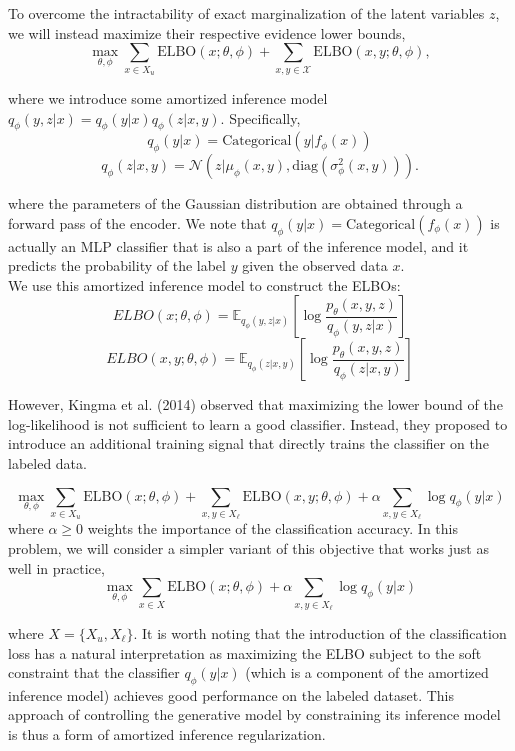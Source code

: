 \documentclass{article}
\theoremstyle{case}
\theoremstyle{definition}
\begin{document}
To overcome the intractability of exact marginalization of the latent variables \( z \), we will instead maximize their respective evidence lower bounds,
\[ \max_{\theta, \phi} \sum_{x \in X_u} \text{ELBO}(x; \theta, \phi) + \sum_{x, y \in \mathcal{X}} \text{ELBO}(x, y; \theta, \phi), \]

where we introduce some amortized inference model \( q_{\phi}(y, z|x) = q_{\phi}(y|x)q_{\phi}(z|x, y) \). Specifically,
\[ q_{\phi}(y|x) = \text{Categorical}(y|f_{\phi}(x)) \]
\[ q_{\phi}(z|x, y) = \mathcal{N}(z|\mu_{\phi}(x, y), \text{diag}(\sigma^2_{\phi}(x, y))). \]

where the parameters of the Gaussian distribution are obtained through a forward pass of the encoder. We note that $q_\phi(y|x) = \text{Categorical}(f_\phi(x))$ 
is actually an MLP classifier that is also a part of the inference model, and it predicts the probability of the label $y$ given the observed data $x$. \\

We use this amortized inference model to construct the ELBOs:
\[ ELBO(x; \theta, \phi) = \mathbb{E}_{q_\phi(y,z|x)} \left[ \log \frac{p_\theta(x, y, z)}{q_\phi(y,z|x)} \right] \]
\[ ELBO(x, y; \theta, \phi) = \mathbb{E}_{q_\phi(z|x,y)} \left[ \log \frac{p_\theta(x, y, z)}{q_\phi(z|x, y)} \right] \]

However, Kingma et al. (2014) observed that maximizing the lower bound of the log-likelihood is not sufficient to learn a good classifier. Instead, they proposed to introduce an additional training signal that directly trains the classifier on the labeled data.

\begin{equation}
\max_{\theta, \phi}  \sum_{x \in X_u} \text{ELBO}(x; \theta, \phi) + \sum_{x, y \in X_\ell} \text{ELBO}(x, y; \theta, \phi) + \alpha \sum_{x, y \in X_\ell} \log q_{\phi}(y|x) 
\end{equation}
where \( \alpha \geq 0 \) weights the importance of the classification accuracy. In this problem, we will consider a simpler variant of this objective that works just as well in practice,
\begin{equation}
\max_{\theta, \phi} \sum_{x \in X} \text{ELBO}(x; \theta, \phi) + \alpha \sum_{x, y \in X_\ell} \log q_{\phi}(y|x)
\end{equation}

where $X = \{X_u, X_\ell\}$. It is worth noting that the introduction of the classification loss has a natural interpretation as maximizing the ELBO subject to the soft constraint that the classifier $q_\phi(y|x)$ (which is a component of the amortized inference model) achieves good performance on the labeled dataset. This approach of controlling the generative model by constraining its inference model is thus a form of amortized inference regularization.
\end{document}
